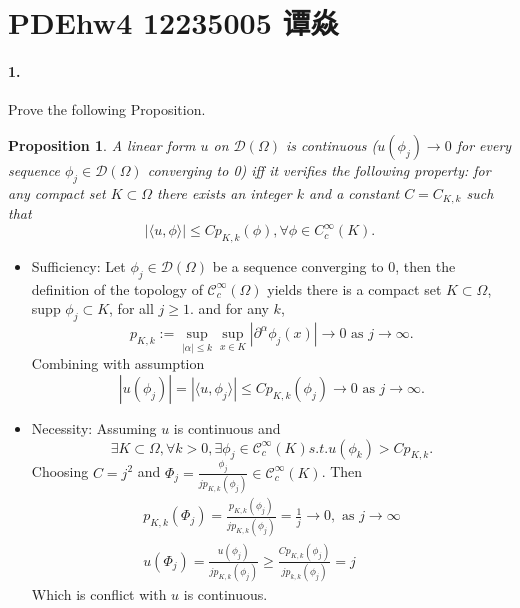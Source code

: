 \documentclass[a4paper]{book}
\makeatletter
\newenvironment{sol}[1][\solname]{\par
  \pushQED{\qed}
  \normalfont \topsep6\p@\@plus6\p@\relax
  \trivlist
  \item[\hskip\labelsep
        \itshape
    #1\@addpunct{.}]\ignorespaces
}{\popQED\endtrivlist\@endpefalse}
\providecommand{\solname}{Solution}
\newtheorem{prop}[thm]{Proposition}
\makeatother
\begin{document}

\pagestyle{fancy}


\setcounter{chapter}{3}



\section{PDEhw4 12235005 谭焱}
\paragraph*{1. }
Prove the following Proposition. 
\begin{prop}
    A linear form $u$ on $\mathcal{D}(\Omega)$ is continuous 
    ($u(\phi_j) \rightarrow 0$ for every sequence $\phi_j \in 
    \mathcal{D}(\Omega)$ converging to 0) iff it verifies the
    following property: for any compact set $K \subset \Omega$ 
    there exists an integer $k$ and a constant $C = C_{K, k}$
    such that 
    \[| \langle u, \phi\rangle | \leq Cp_{K, k}(\phi), \forall \phi \in C_c^\infty(K). \] 
\end{prop}
\begin{sol}
    \begin{itemize}
        \item Sufficiency: Let $\phi_j \in \mathcal{D}(\Omega)$ be 
        a sequence converging to 0, then the definition of the 
        topology of $\mathcal{C}_c^\infty(\Omega)$ yields there is a compact set $K \subset \Omega$,
            supp $\phi_j \subset K$, for all $j \geq 1$.
           and for any $k$, 
            \[ p_{K, k} := \sup_{|\alpha| \leq k} \sup_{x \in K} 
            |\partial^\alpha \phi_j(x)| \rightarrow 0 \text{ as } j \rightarrow \infty.\]
        Combining with assumption 
        \[|u(\phi_j)| = | \langle u, \phi_j \rangle | 
        \leq Cp_{K, k}(\phi_j) \rightarrow 0 \text{ as } j \rightarrow \infty.\]

        \item Necessity: Assuming $u$ is continuous and
        \[\exists K \subset \Omega, \forall k > 0,
        \exists \phi_j \in \mathcal{C}_c^\infty(K) s.t. 
        u(\phi_k) > Cp_{K, k}.\]
        Choosing $C = j^2$ and $ \Phi_j = \frac{\phi_j}{j p_{K, k}(\phi_j)}
        \in \mathcal{C}_c^\infty(K)$. Then 
        \begin{align*}
            p_{K, k}(\Phi_j) = \frac{p_{K, k}(\phi_j)}{j p_{K, k}(\phi_j)} = \frac{1}{j} \rightarrow 0, \text{ as } j \rightarrow \infty \\
            u(\Phi_j) = \frac{u(\phi_j)}{j p_{K, k}(\phi_j)} \geq 
            \frac{C p_{K, k}(\phi_j)}{jp_{k, k}(\phi_j)} = j
        \end{align*}
        Which is conflict with $u$ is continuous.
    \end{itemize}
\end{sol}
\end{document}
